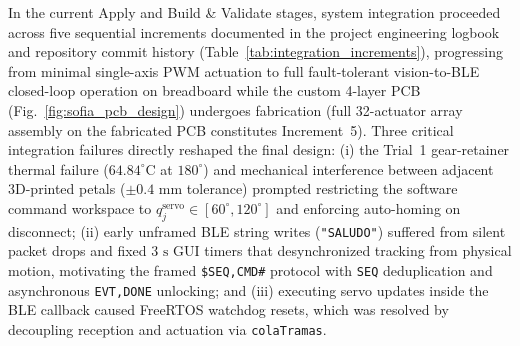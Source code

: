 \documentclass[lettersize,journal]{IEEEtran}
\begin{document}
	In the current Apply and Build \& Validate stages, system integration proceeded across five sequential increments documented in the project engineering logbook and repository commit history (Table~\ref{tab:integration_increments}), progressing from minimal single-axis PWM actuation to full fault-tolerant vision-to-BLE closed-loop operation on breadboard while the custom 4-layer PCB (Fig.~\ref{fig:sofia_pcb_design}) undergoes fabrication (full 32-actuator array assembly on the fabricated PCB constitutes Increment~5). Three critical integration failures directly reshaped the final design: (i) the Trial~1 gear-retainer thermal failure ($64.84^\circ\text{C}$ at $180^\circ$) and mechanical interference between adjacent 3D-printed petals ($\pm 0.4\text{ mm}$ tolerance) prompted restricting the software command workspace to $q_j^{\text{servo}} \in [60^\circ, 120^\circ]$ and enforcing auto-homing on disconnect; (ii) early unframed BLE string writes (\texttt{"SALUDO"}) suffered from silent packet drops and fixed $3\text{ s}$ GUI timers that desynchronized tracking from physical motion, motivating the framed \texttt{\$SEQ,CMD\#} protocol with \texttt{SEQ} deduplication and asynchronous \texttt{EVT,DONE} unlocking; and (iii) executing servo updates inside the BLE callback caused FreeRTOS watchdog resets, which was resolved by decoupling reception and actuation via \texttt{colaTramas}.
	
\end{document}
